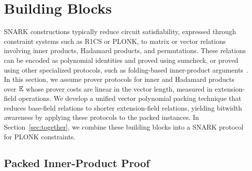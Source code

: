 \section{Building Blocks}
\label{sec:blocks}

SNARK constructions typically reduce circuit satisfiability, expressed through constraint systems such as R1CS or PLONK, to matrix or vector relations involving inner products, Hadamard products, and permutations.
These relations can be encoded as polynomial identities and proved using sumcheck, or proved using other specialized protocols, such as folding-based inner-product arguments~\cite{sp/BunzBBPWM18}.
In this section, we assume prover protocols for inner and Hadamard products over \(\mathbb{E}\) whose prover costs are linear in the vector length, measured in extension-field operations.
We develop a unified vector polynomial packing technique that reduces base-field relations to shorter extension-field relations, yielding bitwidth awareness by applying these protocols to the packed instances.
In Section~\ref{sec:together}, we combine these building blocks into a SNARK protocol for PLONK constraints.

\subsection{Packed Inner-Product Proof}
\label{sec:ip}

